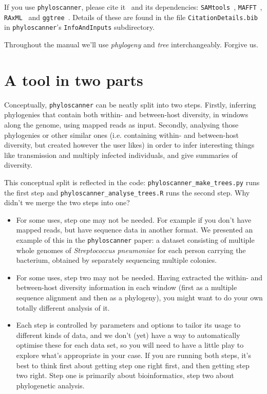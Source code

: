 \documentclass{article}
\newcommand{\p}{\texttt{phyloscanner}\xspace}
\newcommand{\pmt}{\texttt{phyloscanner\_make\_trees.py}\xspace}
\newcommand{\pat}{\texttt{phyloscanner\_analyse\_trees.R}\xspace}
\let\c\texttt
\begin{document}
\vspace*{5mm}

If you use \p, please cite it~\cite{Wymant157768} and its dependencies: \c{SAMtools}~\cite{Li08062009}, \c{MAFFT}~\cite{Katoh15072002}, \c{RAxML}~\cite{doi:10.1093/bioinformatics/btu033} and \c{ggtree}~\cite{MEE3:MEE312628}.
Details of these are found in the file \c{CitationDetails.bib} in \p's \c{InfoAndInputs} subdirectory.

\vspace*{5mm}

Throughout the manual we'll use {\it phylogeny} and {\it tree} interchangeably.
Forgive us.

\newpage
\tableofcontents
\newpage

\section*{A tool in two parts}
Conceptually, \p can be neatly split into two steps.
Firstly, inferring phylogenies that contain both within- and between-host diversity, in windows along the genome, using mapped reads as input.
Secondly, analysing those phylogenies or other similar ones (i.e. containing within- and between-host diversity, but created however the user likes) in order to infer interesting things like transmission and multiply infected individuals, and give summaries of diversity.

This conceptual split is reflected in the code: \pmt runs the first step and \pat runs the second step.
Why didn't we merge the two steps into one?
\begin{itemize}
\item For some uses, step one may not be needed.
For example if you don't have mapped reads, but have sequence data in another format.
We presented an example of this in the \p paper: a dataset consisting of multiple whole genomes of {\it Streptococcus pneumoniae} for each person carrying the bacterium, obtained by separately sequencing multiple colonies.
\item For some uses, step two may not be needed.
Having extracted the within- and between-host diversity information in each window (first as a multiple sequence alignment and then as a phylogeny), you might want to do your own totally different analysis of it.
\item Each step is controlled by parameters and options to tailor its usage to different kinds of data, and we don't (yet) have a way to automatically optimise these for each data set, so you will need to have a little play to explore what's appropriate in your case.
If you are running both steps, it's best to think first about getting step one right first, and then getting step two right.
Step one is primarily about bioinformatics, step two about phylogenetic analysis.
\end{itemize}
\end{document}
